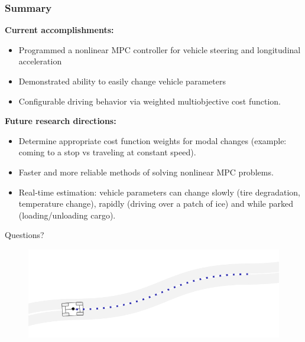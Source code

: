 \documentclass{beamer}
\begin{document}
\begin{frame}
\frametitle{Summary}
\textbf{Current accomplishments:}
\begin{itemize}
	\item Programmed a nonlinear MPC controller for vehicle steering and longitudinal acceleration
	\item Demonstrated ability to easily change vehicle parameters
	\item Configurable driving behavior via weighted multiobjective cost function.
\end{itemize}

\textbf{Future research directions:}
\begin{itemize}
	\item Determine appropriate cost function weights for modal changes (example: coming to a stop vs traveling at constant speed).
	
	\item Faster and more reliable methods of solving nonlinear MPC problems.
\item Real-time estimation: vehicle parameters can change slowly (tire degradation, temperature change), rapidly (driving over a patch of ice) and while parked (loading/unloading cargo).
\end{itemize}

\end{frame}

\begin{frame}
\vspace{8.0em}
\begin{center}
\Huge{Questions?}\normalsize
\vspace{1.0em}
\begin{figure}[b!]
	\centering
	\includegraphics[width=1.0\linewidth]{figures/end_slide.png}
\end{figure}
\end{center}
\end{frame}
	
\end{document}

